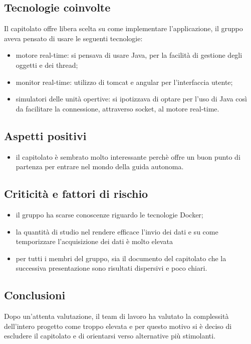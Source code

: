   \subsection{Tecnologie coinvolte}
Il capitolato offre libera scelta su come implementare l'applicazione, il gruppo aveva pensato di usare le seguenti tecnologie:
\begin{itemize}
\item motore real-time: si pensava di usare Java, per la facilità di gestione degli oggetti e dei thread;
\item monitor real-time: utilizzo di tomcat e angular per l'interfaccia utente;
\item simulatori delle unità opertive: si ipotizzava di optare per l'uso di Java così da facilitare la connessione, attraverso socket, al motore real-time.
\end{itemize}

  \subsection{Aspetti positivi}
\begin{itemize}
     \item il capitolato è sembrato molto interessante perchè offre un buon punto di partenza per entrare nel mondo della guida autonoma.
\end{itemize}

  \subsection{Criticità e fattori di rischio}
\begin{itemize}
    \item il gruppo ha scarse conoscenze riguardo le tecnologie Docker;
    \item la quantità di studio nel rendere efficace l'invio dei dati e su come temporizzare l'acquisizione dei dati è molto elevata 
    \item per tutti i membri del gruppo, sia il documento del capitolato che la successiva presentazione sono risultati dispersivi e poco chiari. 
\end{itemize}

  \subsection{Conclusioni}
Dopo un'attenta valutazione, il team di lavoro ha valutato la complessità dell'intero progetto come troppo elevata e per questo motivo si è deciso di escludere il capitolato e di orientarsi verso alternative più stimolanti.
